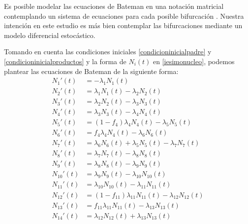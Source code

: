 Es posible modelar las ecuaciones de Bateman en una notación matricial contemplando un sistema de ecuaciones para cada posible bifurcación \cite{Pratiwi.2021}. Nuestra intención en este estudio es más bien contemplar las bifurcaciones mediante un modelo diferencial estocástico.

Tomando en cuenta las condiciones iniciales \ref{condicioninicialpadre} y \ref{condicioninicialproductos} y la forma de $N_i(t)$ en \ref{iesimonucleo}, podemos plantear las ecuaciones de Bateman de la siguiente forma:
\begin{align}
    N_1'(t)&=-\lambda_1 N_1(t)\\ \label{ecubateman1}
    N_2'(t)&=\lambda_1 N_1(t) -\lambda_2 N_2(t)\\
    N_3'(t)&=\lambda_2 N_2(t) -\lambda_3 N_3(t)\\
    N_4'(t)&=\lambda_3 N_3(t) -\lambda_4 N_4(t)\\
    N_5'(t)&=(1-f_4)\lambda_4 N_4(t) -\lambda_5 N_5(t)\\
    N_6'(t)&=f_4 \lambda_4 N_4(t) -\lambda_6 N_6(t)\\
    N_7'(t)&=\lambda_6 N_6(t) + \lambda_5 N_5(t) -\lambda_7 N_7(t)\\
    N_8'(t)&=\lambda_7 N_7(t) -\lambda_8 N_8(t)\\
    N_9'(t)&=\lambda_8 N_8(t) -\lambda_9 N_9(t)\\
    N_{10}'(t)&=\lambda_9 N_9(t) -\lambda_{10} N_{10}(t)\\
%
    N_{11}'(t)&=\lambda_{10} N_{10}(t) -\lambda_{11} N_{11}(t)\\
    N_{12}'(t)&=(1-f_{11})\lambda_{11} N_{11}(t) -\lambda_{12} N_{12}(t)\\
    N_{13}'(t)&=f_{11}\lambda_{11}N_{11}(t) -\lambda_{13} N_{13}(t)\\
    N_{14}'(t)&=\lambda_{12} N_{12}(t) + \lambda_{13} N_{13}(t)
    \label{ecubateman14}
\end{align}

